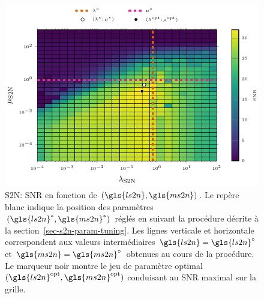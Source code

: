 \begin{figure}[h!]
    \centering
    \includegraphics{img/chapitre3/figure5/s2n-hyper.pdf}
    \caption{S2N: SNR en fonction de $(\gls{ls2n},\gls{ms2n})$. Le repère blanc indique la position des paramètres $(\gls{ls2n}^*,\gls{ms2n}^*)$ réglés en suivant la procédure décrite à la section~\ref{sec-s2n-param-tuning}. Les lignes verticale et horizontale correspondent aux valeurs intermédiaires $\gls{ls2n}=\gls{ls2n}^{\circ}$ et $\gls{ms2n}=\gls{ms2n}^\circ$ obtenues au cours de la procédure. Le marqueur noir montre le jeu de paramètre optimal $(\gls{ls2n}^{\mathrm{opt}},\gls{ms2n}^{\mathrm{opt}})$ conduisant au SNR maximal sur la grille.
        \protect\label{fig-s2n-params-tuning}}
\end{figure}

